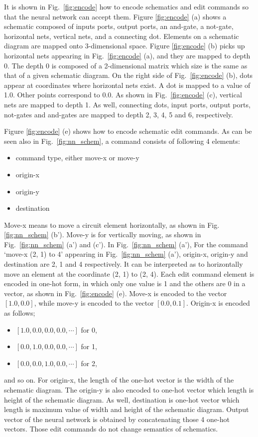 \documentclass[twocolumn]{article}
\begin{document}
It is shown in Fig.\ \ref{fig:encode} how to encode
schematics and edit commands so that the neural network can accept them.
Figure \ref{fig:encode} (a) shows a schematic composed of
inputs ports, output ports, an and-gate, a not-gate,
horizontal nets, vertical nets, and a connecting dot.
Elements on a schematic diagram are
mapped onto 3-dimensional space.
Figure \ref{fig:encode} (b) picks up horizontal nets appearing
in Fig.\ \ref{fig:encode} (a), and they are mapped to depth 0.
The depth 0 is composed of a 2-dimensional matrix which size is the same
as that of a given schematic diagram.
On the right side of Fig.\ \ref{fig:encode} (b),
dots appear at coordinates where horizontal nets exist.
A dot is mapped to a value of 1.0.
Other points correspond to 0.0.
As shown in Fig.\ \ref{fig:encode} (c),
vertical nets are mapped to depth 1.
As well, connecting dots, input ports, output ports, not-gates and and-gates
are mapped to depth 2, 3, 4, 5 and 6, respectively.

Figure \ref{fig:encode} (e) shows how to encode schematic edit commands.
As can be seen also in Fig.\ \ref{fig:nn_schem},
a command consists of following 4 elements:
\begin{itemize}
\item command type, either move-x or move-y
\item origin-x
\item origin-y
\item destination
\end{itemize}
Move-x means to move a circuit element horizontally,
as shown in Fig. \ref{fig:nn_schem} (b').
Move-y is for vertically moving, as shown in
Fig.\ \ref{fig:nn_schem} (a') and (c').
In Fig.\ \ref{fig:nn_schem} (a'), 
For the command `move-x (2, 1) to 4' appearing
in Fig.\ \ref{fig:nn_schem} (a'),
origin-x, origin-y and destination are 2, 1 and 4 respectively.
It can be interpreted as to horizontally move an element
at the coordinate (2, 1) to (2, 4).
Each edit command element is encoded in one-hot form,
in which only one value is 1 and the others are 0 in a vector,
as shown in Fig.\ \ref{fig:encode} (e).
Move-x is encoded to the vector $[1.0, 0.0]$, 
while move-y is encoded to the vector $[0.0, 0.1]$. 
Origin-x is encoded as follows;
\begin{itemize}
\item $[1.0, 0.0, 0.0, 0.0, \cdots]$ for 0,
\item $[0.0, 1.0, 0.0, 0.0, \cdots]$ for 1, 
\item $[0.0, 0.0, 1.0, 0.0, \cdots]$ for 2,
\end{itemize}
and so on.
For origin-x, the length of the one-hot vector is the width of
the schematic diagram.
The origin-y is also encoded to one-hot vector which length is
height of the schematic diagram.
As well, destination is one-hot vector which length is
maximum value of width and height of the schematic diagram.
Output vector of the neural network is obtained
by concatenating those 4 one-hot vectors.
Those edit commands do not change semantics of schematics.
\end{document}
